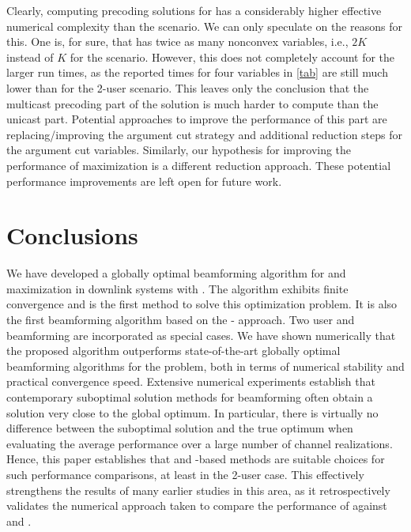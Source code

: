 \documentclass[a4paper,10pt,journal]{IEEEtran}
\begin{document}
Clearly, computing precoding solutions for  has a considerably higher effective numerical complexity than the  scenario.
We can only speculate on the reasons for this. One is, for sure, that  has twice as many nonconvex variables, i.e., $2K$ instead of $K$ for the  scenario. However, this does not completely account for the larger run times, as the reported times for four variables in \cref{tab} are still much lower than for the 2-user  scenario. This leaves only the conclusion that the multicast precoding part of the  solution is much harder to compute than the unicast part. Potential approaches to improve the performance of this part are replacing/improving the argument cut strategy and additional reduction steps for the argument cut variables. Similarly, our hypothesis for improving the performance of  maximization is a different reduction approach. These potential performance improvements are left open for future work.




\section{Conclusions}
\label{sec:conclusions}
We have developed a globally optimal beamforming algorithm for  and  maximization in  downlink systems with . The algorithm exhibits finite convergence and is the first method to solve this optimization problem. It is also the first beamforming algorithm based on the - approach.
Two user  and  beamforming are incorporated as special cases. We have shown numerically that the proposed algorithm outperforms state-of-the-art globally optimal beamforming algorithms for the  problem, both in terms of numerical stability and practical convergence speed. Extensive numerical experiments establish that contemporary suboptimal solution methods for  beamforming often obtain a solution very close to the global optimum. In particular, there is virtually no difference between the suboptimal solution and the true optimum when evaluating the average performance over a large number of channel realizations. Hence, this paper establishes that  and -based methods are  suitable choices for such performance comparisons, at least in the 2-user case. This effectively strengthens the results of many earlier studies in this area, as it retrospectively validates the numerical approach taken to compare the performance of  against  and .
\end{document}
